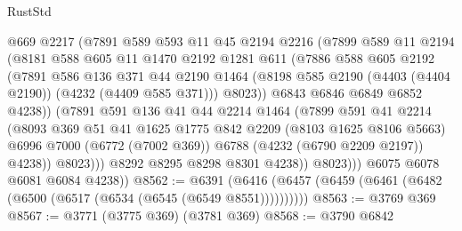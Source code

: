 \begin{lexlean}{RustStd}
\begin{coremodule}
                    @669
                    @2217
                    (@7891
                      @589
                      @593
                      @11
                      @45
                      @2194
                      @2216
                      (@7899
                        @589
                        @11
                        @2194
                        (@8181
                          @588
                          @605
                          @11
                          @1470
                          @2192
                          @1281
                          @611
                          (@7886
                            @588
                            @605
                            @2192
                            (@7891
                              @586
                              @136
                              @371
                              @44
                              @2190
                              @1464
                              (@8198 @585 @2190 (@4403 (@4404 @2190)) (@4232 (@4409 @585 @371)))
                              @8023))
                          @6843
                          @6846
                          @6849
                          @6852
                          @4238))
                      (@7891
                        @591
                        @136
                        @41
                        @44
                        @2214
                        @1464
                        (@7899
                          @591
                          @41
                          @2214
                          (@8093
                            @369
                            @51
                            @41
                            @1625
                            @1775
                            @842
                            @2209
                            (@8103 @1625 @8106 @5663)
                            @6996
                            @7000
                            (@6772 (@7002 @369))
                            @6788
                            (@4232 (@6790 @2209 @2197))
                            @4238))
                        @8023)))
                  @8292
                  @8295
                  @8298
                  @8301
                  @4238))
              @8023)))
        @6075
        @6078
        @6081
        @6084
        @4238))
@8562 := @6391 (@6416 (@6457 (@6459 (@6461 (@6482 (@6500 (@6517 (@6534 (@6545 (@6549 @8551))))))))))
@8563 := @3769 @369
@8567 := @3771 (@3775 @369) (@3781 @369)
@8568 := @3790 @6842

\end{coremodule}
\end{lexlean}
